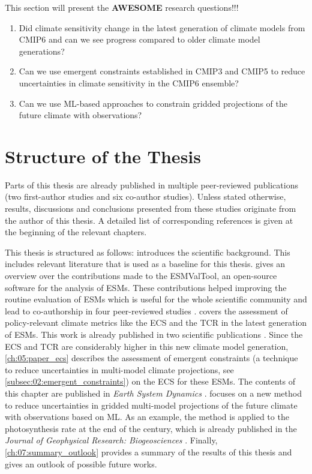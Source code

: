 This section will present the \textbf{AWESOME} research questions!!!

\begin{enumerate}
  \item Did climate sensitivity change in the latest generation of climate
  models from \acs{CMIP}6 and can we see progress compared to older climate
  model generations?

  \item Can we use emergent constraints established in \acs{CMIP}3 and
  \acs{CMIP}5 to reduce uncertainties in climate sensitivity in the \acs{CMIP}6
  ensemble?

  \item Can we use \ac{ML}-based approaches to constrain gridded projections of
  the future climate with observations?
\end{enumerate}


\section{Structure of the Thesis}
\label{sec:01:structure}

Parts of this thesis are already published in multiple peer-reviewed
publications (two first-author studies and six co-author studies). Unless
stated otherwise, results, discussions and conclusions presented from these
studies originate from the author of this thesis. A detailed list of
corresponding references is given at the beginning of the relevant chapters.

This thesis is structured as follows: 
introduces the scientific background. This includes relevant literature that is
used as a baseline for this thesis.  gives an overview
over the contributions made to the \ac{ESMValTool}, an open-source software for
the analysis of \acp{ESM}. These contributions helped improving the routine
evaluation of \acp{ESM} which is useful for the whole scientific community and
lead to co-authorship in four peer-reviewed studies \autocite{Eyring2020,
  Lauer2020, Righi2020, Weigel2020}. 
covers the assessment of policy-relevant climate metrics like the \ac{ECS} and
the \ac{TCR} in the latest generation of \acp{ESM}. This work is already
published in two scientific publications \autocite{Bock2020, Meehl2020}. Since
the \ac{ECS} and \ac{TCR} are considerably higher in this new climate model
generation, \cref{ch:05:paper_ecs} describes the assessment of emergent
constraints (a technique to reduce uncertainties in multi-model climate
projections, see \cref{subsec:02:emergent_constraints}) on the \ac{ECS} for
these \acp{ESM}. The contents of this chapter are published in \emph{Earth
  System Dynamics} \autocite{Schlund2020a}.  focuses on a
new method to reduce uncertainties in gridded multi-model projections of the
future climate with observations based on \ac{ML}. As an example, the method is
applied to the photosynthesis rate at the end of the  century, which is
already published in the \emph{Journal of Geophysical Research: Biogeosciences}
\autocite{Schlund2020}. Finally, \cref{ch:07:summary_outlook} provides a
summary of the results of this thesis and gives an outlook of possible future
works.